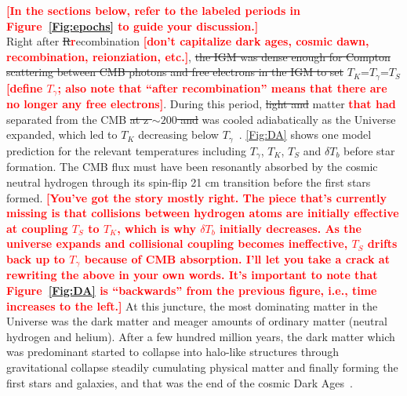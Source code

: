 \documentclass[12pt,a4paper]{report}
\newcommand{\attention}[1]{\textcolor{red}{\bf {#1}}}
\begin{document}
\attention{[In the sections below, refer to the labeled periods in Figure~\ref{Fig:epochs} to guide your discussion.]} \\
        
	Right after \st{R}\attention{r}ecombination \attention{[don't capitalize dark ages, cosmic dawn, recombination, reionziation, etc.]}, \st{the IGM was dense enough for Compton scattering between CMB photons and free electrons in the IGM to set} $T_K$=$T_\gamma$=$T_S$ \attention{[define $T_\gamma$; also note that ``after recombination'' means that there are no longer any free electrons]}. During this period, \st{light and} matter \attention{that had} separated from the CMB \st{at z $\sim200$ and} was cooled adiabatically as the Universe expanded, which led to $T_K$ decreasing below $T_\gamma$~\citep{2006PhR...433..181F}. \autoref{Fig:DA} shows one model prediction for the relevant temperatures including $T_\gamma$, $T_K$, $T_S$ and $\delta$$T_b$ before star formation. The CMB flux must have been resonantly absorbed by the cosmic neutral hydrogen through its spin-flip 21 cm transition before the first stars formed. \attention{[You've got the story mostly right.  The piece that's currently missing is that collisions between hydrogen atoms are initially effective at coupling $T_S$ to $T_K$, which is why $\delta T_b$ initially decreases.  As the universe expands and collisional coupling becomes ineffective, $T_S$ drifts back up to $T_\gamma$ because of CMB absorption.  I'll let you take a crack at rewriting the above in your own words.  It's important to note that Figure~\ref{Fig:DA} is ``backwards'' from the previous figure, i.e., time increases to the left.]}  At this juncture, the most dominating matter in the Universe was the dark matter and meager amounts of ordinary matter (neutral hydrogen and helium). After a few hundred million years, the dark matter which was predominant started to collapse into halo-like structures through gravitational collapse steadily cumulating physical matter and finally forming the first stars and galaxies, and that was the end of the cosmic Dark Ages~\citep{2003Sci...300.1904M}.
\end{document}
